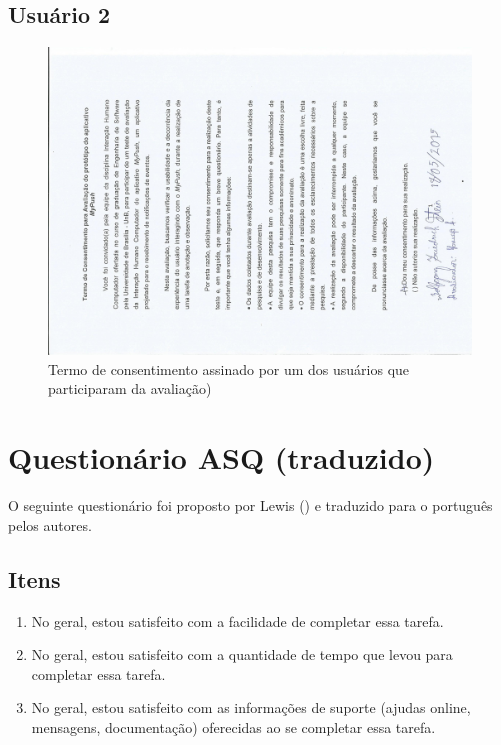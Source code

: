 \begin{anexosenv}
   \section*{Usuário 2}
    \begin{figure}[!htbp]
      \centering
      \includegraphics[scale=0.7, angle=-90]{editaveis/figuras/termousuario2}
      \caption{Termo de consentimento assinado por um dos usuários que participaram da avaliação)}
      \label{termo_consentimento_1}
    \end{figure}
	
  \chapter{Questionário ASQ (traduzido)}
      
      O seguinte questionário foi proposto por Lewis (\citeyear{lewis91}) e traduzido para o português pelos autores.
      
      \section*{Itens}
	
	\begin{enumerate}
	  \item No geral, estou satisfeito com a facilidade de completar essa tarefa.
	  \item No geral, estou satisfeito com a quantidade de tempo que levou para completar essa tarefa.
	  \item No geral, estou satisfeito com as informações de suporte (ajudas online, mensagens, documentação)
	    oferecidas ao se completar essa tarefa.
	\end{enumerate}
      

\end{anexosenv}
